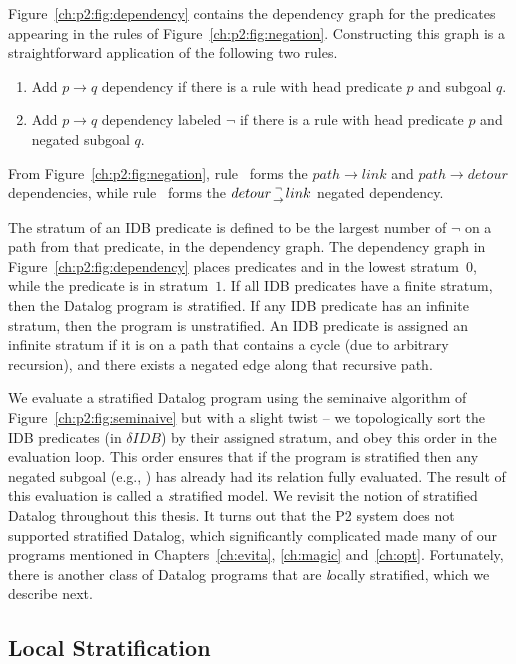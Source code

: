Figure~\ref{ch:p2:fig:dependency} contains the dependency graph for the predicates
appearing in the rules of Figure~\ref{ch:p2:fig:negation}. Constructing this graph
is a straightforward application of the following two rules.
\begin{enumerate}
  \ssp
  \item Add $p \rightarrow q$ dependency if there is a rule with head predicate $p$ and subgoal $q$.
  \item Add $p \rightarrow q$ dependency labeled $\neg$ if there is a rule with head predicate $p$ and negated subgoal $q$.
\end{enumerate}
From Figure~\ref{ch:p2:fig:negation}, rule~ forms the $path \rightarrow
link$ and $path \rightarrow detour$ dependencies, while rule~ forms the
$detour {\neg \atop \rightarrow} link$ negated dependency. 

The stratum of an IDB predicate is defined to be the largest number of $\neg$
on a path from that predicate, in the dependency graph.  The dependency graph
in Figure~\ref{ch:p2:fig:dependency} places predicates  and
 in the lowest stratum~$0$, while the  predicate is in
stratum~$1$.  If all IDB predicates have a finite stratum, then the Datalog
program is {\emph stratified}.  If any IDB predicate has an infinite stratum,
then the program is unstratified.  An IDB predicate is assigned an infinite
stratum if it is on a path that contains a cycle (due to arbitrary recursion),
and there exists a negated edge along that recursive path.

We evaluate a stratified Datalog program using the seminaive algorithm of
Figure~\ref{ch:p2:fig:seminaive} but with a slight twist -- we topologically
sort the IDB predicates (in $\delta IDB$) by their assigned stratum, and obey
this order in the evaluation loop.  This order ensures that if the program is
stratified then any negated subgoal (e.g., ) has already had its
relation fully evaluated.  The result of this evaluation is called a {\emph
stratified model}.  We revisit the notion of stratified Datalog throughout this
thesis.  It turns out that the P2 system does not supported stratified Datalog,
which significantly complicated made many of our \OVERLOG programs mentioned in
Chapters~\ref{ch:evita}, \ref{ch:magic} and~\ref{ch:opt}. Fortunately, there
is another class of Datalog programs that are {\emph locally} stratified, which
we describe next.

\subsection{Local Stratification}

